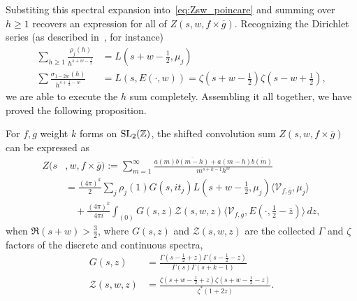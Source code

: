 Substiting this spectral expansion into~\eqref{eq:Zsw_poincare} and summing over $h \geq
1$ recovers an expression for all of $Z(s, w, f\times \overline{g})$.
Recognizing the Dirichlet series (as described in~\cite{Goldfeld2006automorphic}, for
instance)
\begin{align}
  \sum_{h \geq 1} \frac{\rho_j(h)}{h^{s + w - \frac{1}{2}}} &= L(s + w - \tfrac{1}{2},
  \mu_j) \\
  \sum \frac{\sigma_{1-2w}(h)}{h^{s + \frac{1}{2} - w}} &= L(s, E(\cdot, w)) = \zeta(s + w
  - \tfrac{1}{2})\zeta(s - w + \tfrac{1}{2}),
\end{align}
we are able to execute the $h$ sum completely.
Assembling it all together, we have proved the following proposition.


\begin{proposition}\label{prop:spectralexpansionfull}
  For $f,g$ weight $k$ forms on $\operatorname{SL}_2(\mathbb{Z})$, the shifted convolution sum $Z(s, w,
  f\times \overline{g} )$ can be expressed as
\begin{align}
  Z(s&, w, f\times \overline{g} ) := \sum_{m=1}^\infty \frac{a(m)
  \overline{b(m-h)}+a(m-h)\overline{b(m)} }{m^{s+k -1}h^w} \nonumber \\
  &= \frac{(4\pi )^k}{2} \sum_j\rho_j(1) G(s, i t_j) L(s + w -\tfrac{1}{2},\mu_j)\langle
\mathcal{V}_{f,\overline{g} },\mu_j \rangle \label{line:1spectralexp} \\
  &\quad+\frac{(4\pi)^{k}}{4\pi i}\int_{(0)} G(s, z) \mathcal{Z}(s,w,z) \langle
  \mathcal{V}_{f,\overline{g} },E(\cdot,\tfrac{1}{2}-\overline{z})\rangle \,dz,
  \label{line:2spectralexp}
\end{align}
when $\Re (s+w)>\frac{3}{2}$, where $G(s, z)$ and $\mathcal{Z} (s,w,z)$ are the collected
$\Gamma$ and $\zeta$ factors of the discrete and continuous spectra,
\begin{align*}
  G(s, z) &= \frac{\Gamma(s - \tfrac{1}{2} + z)\Gamma(s - \tfrac{1}{2} -
  z)}{\Gamma(s)\Gamma(s+k-1)} \\
  \mathcal{Z}(s,w,z) &= \frac{\zeta(s + w -\frac{1}{2} + z)\zeta(s + w -\frac{1}{2} -
  z)}{\zeta^*(1+2z)}.
\end{align*}
\end{proposition}


